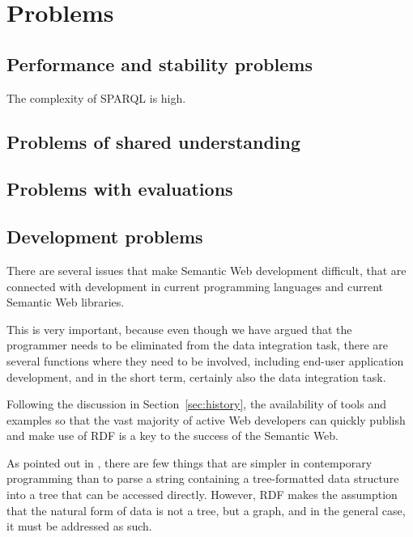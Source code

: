\section{Problems}\label{sec:problems}

\subsection{Performance and stability problems}\label{sec:perfproblems}

\begin{problem}
The complexity of SPARQL is high.
\end{problem}

\subsection{Problems of shared understanding}\label{sec:semproblems}

\subsection{Problems with evaluations}\label{sec:evalproblems}

\subsection{Development problems}\label{sec:devproblems}

There are several issues that make Semantic Web development difficult,
that are connected with development in current programming languages
and current Semantic Web libraries.

This is very important, because even though we have argued that the
programmer needs to be eliminated from the data integration task,
there are several functions where they need to be involved, including
end-user application development, and in the short term, certainly
also the data integration task. 

Following the discussion in Section~\ref{sec:history}, the
availability of tools and examples so that the vast majority of active
Web developers can quickly publish and make use of RDF is a key to the
success of the Semantic Web.

As pointed out in \cite{darobin1}, there are few things that are
simpler in contemporary programming than to parse a string containing
a tree-formatted data structure into a tree that can be accessed
directly. However, RDF makes the assumption that the natural form of
data is not a tree, but a graph, and in the general case, it must be
addressed as such.


